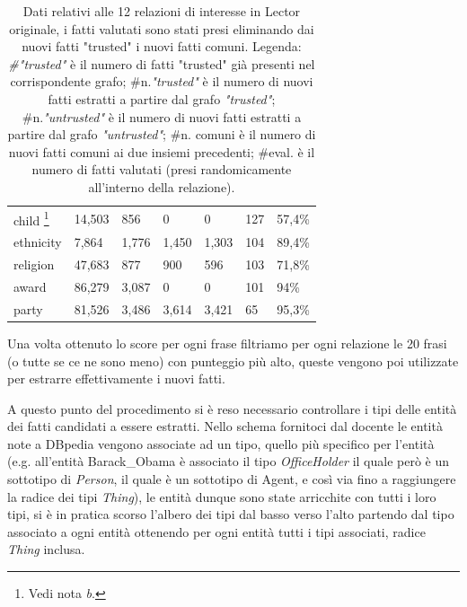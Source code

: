 \documentclass[10pt,a4paper,twocolumn]{article}
\begin{document}
\begin{table}[t]
\begin{minipage}{\textwidth}
\begin{tabular}{lllllll}
		child \footnote{Vedi nota \textit{b}.}                & 14,503               & 856                      & 0                          & 0            & 127        & 57,4\%     \\
		ethnicity            & 7,864                & 1,776                    & 1,450                      & 1,303        & 104        & 89,4\%     \\
		religion             & 47,683               & 877                      & 900                        & 596          & 103        & 71,8\%     \\
		award                & 86,279               & 3,087                    & 0                          & 0            & 101        & 94\%       \\
		party                & 81,526               & 3,486                    & 3,614                      & 3,421        & 65         & 95,3\%    
		\end{tabular}
	\end{minipage}
	\caption{Dati relativi alle 12 relazioni di interesse in Lector originale, i fatti valutati sono stati presi eliminando dai nuovi fatti "trusted" i nuovi fatti comuni. \newline Legenda: \textit{\#"trusted"} è il numero di fatti "trusted" già presenti nel corrispondente grafo; \#n.\textit{"trusted"} è il numero di nuovi fatti estratti a partire dal grafo \textit{"trusted"}; \#n.\textit{"untrusted"} è il numero di nuovi fatti estratti a partire dal grafo \textit{"untrusted"}; \#n. comuni è il numero di nuovi fatti comuni ai due insiemi precedenti; \#eval. è il numero di fatti valutati (presi randomicamente all'interno della relazione).}
	\label{dati}
\end{table}

Una volta ottenuto lo score per ogni frase filtriamo per ogni relazione le 20 frasi (o tutte se ce ne sono meno) con punteggio più alto, queste vengono poi utilizzate per estrarre effettivamente i nuovi fatti. 

A questo punto del procedimento si è reso necessario controllare i tipi delle entità dei fatti candidati a essere estratti. Nello schema fornitoci dal docente le entità note a DBpedia vengono associate ad un tipo, quello più specifico per l'entità (e.g. all'entità Barack\_Obama è associato il tipo \textit{OfficeHolder} il quale però è un sottotipo di \textit{Person}, il quale è un sottotipo di Agent, e così via fino a raggiungere la radice dei tipi \textit{Thing}), le entità dunque sono state arricchite con tutti i loro tipi, si è in pratica scorso l'albero dei tipi dal basso verso l'alto partendo dal tipo associato a ogni entità ottenendo per ogni entità tutti i tipi associati, radice \textit{Thing} inclusa.
\end{document}
